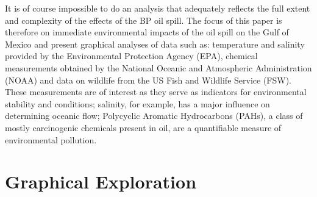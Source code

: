 \documentclass[authoryear,12pt]{elsarticle}
\begin{document}
It is of course impossible to do an analysis that adequately reflects the full extent and complexity of the effects of the BP oil spill. The focus  of this paper is therefore on immediate environmental impacts of the oil spill on the Gulf of Mexico and present graphical analyses of data such as: temperature and salinity provided by the Environmental Protection Agency (EPA), chemical measurements obtained by the National Oceanic and Atmospheric Administration (NOAA) and data on wildlife from the US Fish and Wildlife Service (FSW). These measurements are of interest as they serve as indicators for environmental stability and conditions; salinity, for example, has a major influence on determining oceanic flow;  Polycyclic Aromatic Hydrocarbons (PAHs),  a class of mostly carcinogenic chemicals present in oil, are a quantifiable measure of environmental pollution.




%
\section{Graphical Exploration}
\end{document}

